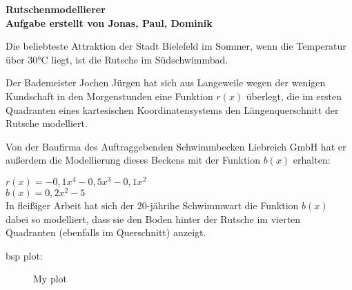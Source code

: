 \documentclass{article}
\begin{document}
\begin{center}
    \huge \bf{Rutschenmodellierer}\\
    \footnotesize{Aufgabe erstellt von Jonas, Paul, Dominik}
\end{center}

\vspace{1.5cm}

Die beliebteste Attraktion der Stadt Bielefeld im Sommer, wenn die Temperatur über 30°C liegt, ist die Rutsche im Südschwimmbad.

Der Bademeister Jochen Jürgen hat sich aus Langeweile wegen der wenigen Kundschaft in den Morgenstunden eine Funktion $r(x)$ überlegt, die im ersten Quadranten eines kartesischen Koordinatensystems den Längenquerschnitt der Rutsche modelliert. 

Von der Baufirma des Auftraggebenden Schwimmbecken Liebreich GmbH hat er außerdem die Modellierung dieses Beckens mit der Funktion $b(x)$ erhalten:\\

\vspace{0.2cm}

$r(x) = -0,1x^4 - 0,5x^3 - 0,1x^2$ \\

$b(x) = 0,2x^2 - 5$\\

In fleißiger Arbeit hat sich der 20-jährihe Schwimmwart die Funktion $b(x)$ dabei so modelliert, dass sie den Boden hinter der Rutsche im vierten Quadranten (ebenfalls im Querschnitt) anzeigt.

\vspace{2cm}

bsp plot:\\
\begin{figure}[h]
    \centering
{}

\caption{My plot}
    \label{fig:myplot}
\end{figure}
\end{document}
